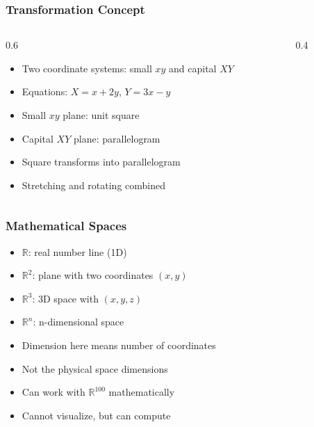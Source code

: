 \begin{frame}[fragile]\frametitle{Transformation Concept}
  \begin{columns}
    \begin{column}[T]{0.6\linewidth}
      \begin{itemize}
        \item Two coordinate systems: small $xy$ and capital $XY$
        \item Equations: $X = x + 2y$, $Y = 3x - y$
        \item Small $xy$ plane: unit square
        \item Capital $XY$ plane: parallelogram
        \item Square transforms into parallelogram
        \item Stretching and rotating combined
      \end{itemize}
    \end{column}
    \begin{column}[T]{0.4\linewidth}
      \begin{center}
      \end{center}
    \end{column}
  \end{columns}
\end{frame}

\begin{frame}[fragile]\frametitle{Mathematical Spaces}
  \begin{itemize}
    \item $\mathbb{R}$: real number line (1D)
    \item $\mathbb{R}^2$: plane with two coordinates $(x, y)$
    \item $\mathbb{R}^3$: 3D space with $(x, y, z)$
    \item $\mathbb{R}^n$: n-dimensional space
    \item Dimension here means number of coordinates
    \item Not the physical space dimensions
    \item Can work with $\mathbb{R}^{100}$ mathematically
    \item Cannot visualize, but can compute
  \end{itemize}
\end{frame}

